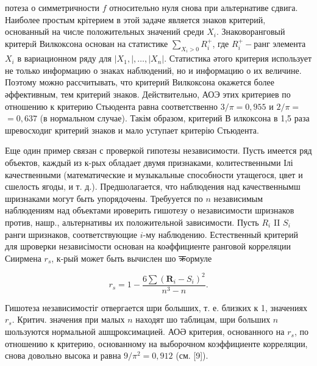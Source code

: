 \documentclass[10pt]{article}
\begin{document}
потеза о симметричности $f$ относительно нуля снова при альтернативе сдвига. Наиболее простым крітерием в этой задаче является знаков критерий, основанный на числе положительных значений среди $X_{i}$. Знаковоранговый критерıй Вилкоксона основан на статистике $\sum_{X_{i}>0} R_{i}^{+}$, где $R_{i}^{+}-$ранг элемента $X_{i}$ в вариационном ряду для $\left|X_{1},\right|, \ldots,\left|X_{n}\right|$. Статистика әтого критерия использует не только информацию о знаках наблюдений, но и информацию о их величине. Поэтому можно рассчитывать, что критерий Вилкоксона окажется более әффективным, тем критерий знаков. Действительно, АОЭ этих критериев по отношению к критерию Стьюдента равна соответственно $3 / \pi=0,955$ и $2 / \pi=$ $=0,637$ (в нормальном случае). Такім образом, критерий В илкоксона в 1,5 раза шревосходиг критерий знаков и мало уступает критерію Стьюдента.



Еще один пример связан с проверкой гипотезы независимости. Пусть имеется ряд объектов, каждый из к-рых обладает двумя признаками, колитественными Ілі качественными (математические и музыкальные способности утащегося, цвет и сшелость ягоды, и т. д.). Предшолагается, что наблюдения над качественнымш шризнаками могут быть упорядочены. Требууется по $n$ независимым наблюдениям над объектами ироверить гишотезу о независимости шризнаков против, нашр., альтернативы их положительной зависимости. Пусть $R_{i}$ II $S_{i}$ ранги шризнаков, соответствующие $i$-му наблюдению. Естественный критерий для шроверки независімости основан на коәффициенте ранговой корреляции Сиирмена $r_{s}$, к-рый может быть вычислен шо क्रормуле



\[

r_{s}=1-\frac{6 \sum\left(\boldsymbol{R}_{i}-S_{i}\right)^{2}}{n^{3}-n} .

\]



Гишотеза независимостіг отвергается шри болыших, т. е. близких к 1, значениях $r_{s}$. Критич. значения при малых $n$ находят шо таблицам, шри больших $n$ шользуются нормальной ашщроксимацией. АОӘ критерия, основанного на $r_{s}$, по отношению к критерию, основанному на выборочном коэффициенте корреляции, снова довольно высока и равна $9 / \pi^{2}=0,912$ (см. [9]).
\end{document}

